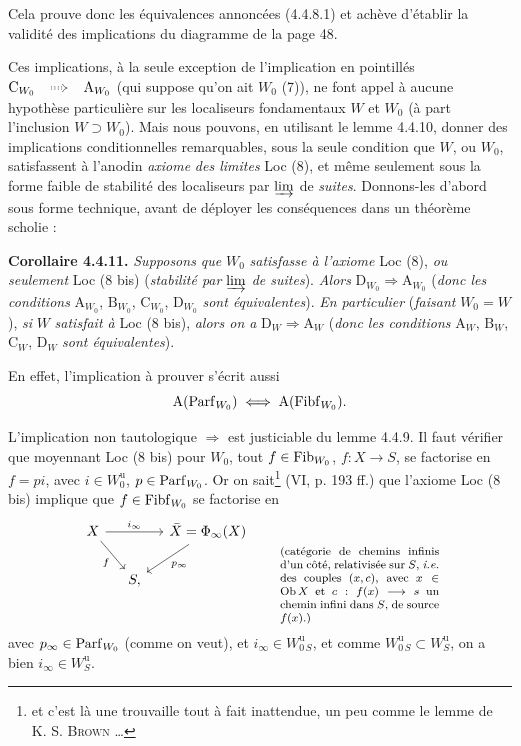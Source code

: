 Cela prouve donc les équivalences annoncées (4.4.8.1) et achève d'établir la validité des implications du diagramme de la page 48.

Ces implications, à la seule exception de l'implication en pointillés $\mathrm{C}_{W_0} \dottedimpl \mathrm{A}_{W_0}$ (qui suppose qu'on ait $W_0$ (7)), ne font appel à aucune hypothèse particulière sur les localiseurs fondamentaux $W$ et $W_0$ (à part l'inclusion $W \supset W_0$). Mais nous pouvons, en utilisant le lemme 4.4.10, donner des implications conditionnelles remarquables, sous la seule condition que $W$, ou $W_0$, satisfassent à l'anodin \textit{axiome}
\textit{des limites} Loc (8), et même seulement sous la forme faible de stabilité des localiseurs par $\varinjlim$ de \textit{suites}. Donnons-les d'abord sous forme technique, avant de déployer les conséquences dans un théorème scholie :

\textbf{Corollaire 4.4.11.} \textit{Supposons que} $W_0$ \textit{satisfasse à l'axiome} Loc (8), \textit{ou seulement} Loc (8 bis) (\textit{stabilité par} $\varinjlim$ \textit{de suites}). \textit{Alors} $\mathrm{D}_{W_0} \Longrightarrow \mathrm{A}_{W_0}$ (\textit{donc les conditions} $\mathrm{A}_{W_0}$, $\mathrm{B}_{W_0}$, $\mathrm{C}_{W_0}$, $\mathrm{D}_{W_0}$ \textit{sont équivalentes}). \textit{En particulier} (\textit{faisant} $W_0 = W$), \textit{si} $W$ \textit{satisfait à} Loc (8 bis), \textit{alors on a} $\mathrm{D}_W \Longrightarrow \mathrm{A}_W$ (\textit{donc les conditions} $\mathrm{A}_W$, $\mathrm{B}_W$, $\mathrm{C}_W$, $\mathrm{D}_W$ \textit{sont équivalentes}).

En effet, l'implication à prouver s'écrit aussi
\[
\mathrm{A}(\mathrm{Parf}_{W_0}) \;\Longleftrightarrow\; \mathrm{A}(\mathrm{Fibf}_{W_0}).
\]

L'implication non tautologique $\Longrightarrow$ est justiciable du lemme 4.4.9. Il faut vérifier que moyennant Loc (8 bis) pour $W_0$, tout $f \in \mathrm{Fib}_{W_0}$, $f : X \longrightarrow S$, se factorise en $f = pi$, avec $i \in W^{\mathrm{u}}_0$, $p \in \mathrm{Parf}_{W_0}$. Or on sait\footnote{et c'est là une trouvaille tout à fait inattendue, un peu comme le lemme de K. S. \textsc{Brown} \ldots} (VI, p. 193 ff.) %
que l'axiome Loc (8 bis) implique que $f \in \mathrm{Fibf}_{W_0}$ se factorise en
\[
\begin{tikzcd}[column sep=small]
X \arrow[rr, "i_\infty"] \arrow[dr, "f"'] & & \bar{X} = \Phi_\infty(X) \arrow[dl, "p_\infty"] \\
& S, &
\end{tikzcd}
\qquad
\text{\parbox[t]{0.33\textwidth}{\footnotesize (catégorie de chemins infinis d'un côté, relativisée sur $S$, \textit{i.e.} des couples $(x,c)$, avec $x \in \Ob X$ et $c : f(x) \longrightarrow s$ un chemin infini dans $S$, de source $f(x)$.)}}
\]
avec $p_\infty \in \mathrm{Parf}_{W_0}$ (comme on veut), et $i_\infty \in W^{\mathrm{u}}_{0\,S}$, et comme $W^{\mathrm{u}}_{0\,S} \subset W^{\mathrm{u}}_S$, on a bien $i_\infty \in W^{\mathrm{u}}_S$.

